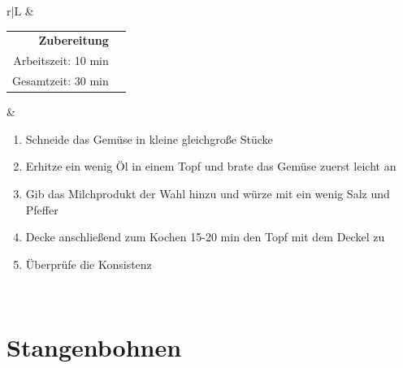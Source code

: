 \documentclass[a4paper, 12pt]{scrbook} 								%
\numberwithin{equation}{section} 									%
\begin{document}
\begin{tabularx}{\textwidth}{r|L}
								&	\\	
		\begin{tabular}[t]{rr}
			\textbf{Zubereitung}	\\
			Arbeitszeit: 10 min	\\
			Gesamtzeit:	30 min		\\
		\end{tabular}			&	\begin{enumerate}[nosep]
										\item Schneide das Gemüse in kleine gleichgroße Stücke
										\item Erhitze ein wenig Öl in einem Topf und brate das Gemüse zuerst leicht an
										\item Gib das Milchprodukt der Wahl hinzu und würze mit ein wenig Salz und Pfeffer
										\item Decke anschließend zum Kochen 15-20 min den Topf mit dem Deckel zu
										\item Überprüfe die Konsistenz
									\end{enumerate}	\\
	\end{tabularx}
	\newpage


	\section{Stangenbohnen}	\label{stangenbohnen}
\end{document}
